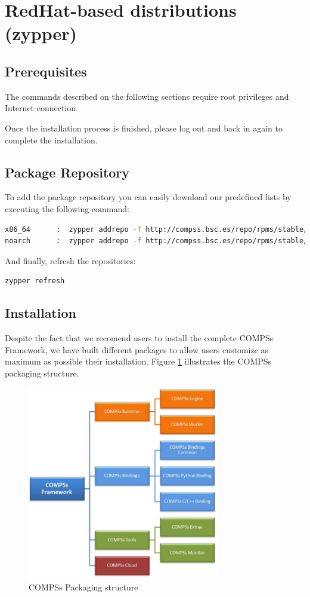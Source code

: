 \section{RedHat-based distributions (zypper)}
\label{sec:RedHat_zypper}


\subsection{Prerequisites}
The commands described on the following sections require root privileges and Internet connection.

Once the installation process is finished, please log out and back in again to complete the installation. 

\subsection{Package Repository}
To add the package repository you can easily download our predefined lists by executing the following command:
\begin{lstlisting}[language=bash]
x86_64      :  zypper addrepo -f http://compss.bsc.es/repo/rpms/stable/suse/x86_64 compss
noarch      :  zypper addrepo -f http://compss.bsc.es/repo/rpms/stable/suse/noarch compss
\end{lstlisting}

And finally, refresh the repositories:
\begin{lstlisting}[language=bash]
zypper refresh
\end{lstlisting}

\subsection{Installation}
Despite the fact that we recomend users to install the complete COMPSs Framework, we have built different packages to allow users
customize as maximum as possible their installation. Figure \ref{fig:compss_packages_zypper} illustrates the COMPSs packaging structure.
\begin{figure}[ht!]
  \centering
    \includegraphics[width=0.75\textwidth]{./Sections/3_RedHat_zypper/Figures/compss_packages.jpeg}
    \caption{COMPSs Packaging structure}
    \label{fig:compss_packages_zypper}
\end{figure}

